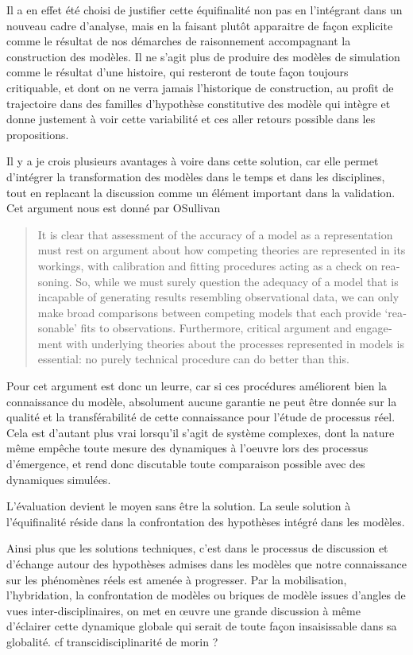 Il a en effet été choisi de justifier cette équifinalité non pas en l'intégrant dans un nouveau cadre d'analyse, mais en la faisant plutôt apparaitre de façon explicite comme le résultat de nos démarches de raisonnement accompagnant la construction des modèles. Il ne s'agit plus de produire des modèles de simulation comme le résultat d'une histoire, qui resteront de toute façon toujours critiquable, et dont on ne verra jamais l'historique de construction, au profit de trajectoire dans des familles d'hypothèse constitutive des modèle qui intègre et donne justement à voir cette variabilité et ces aller retours possible dans les propositions.

Il y a je crois plusieurs avantages à voire dans cette solution, car elle permet d'intégrer la transformation des modèles dans le temps et dans les disciplines, tout en replacant la discussion comme un élément important dans la validation. Cet argument nous est donné par OSullivan 

\foreignblockquote{english}[\cite{OSullivan2004}]{It is clear that assessment of the accuracy of a model as a representation must rest on argument about how competing theories are represented in its workings, with calibration and fitting procedures acting as a check on reasoning. So, while we must surely question the adequacy of a model that is incapable of generating results resembling observational data, we can only make broad comparisons between competing models that each provide ‘reasonable’ fits to observations. Furthermore, critical argument and engagement with underlying theories about the processes represented in models is essential: no purely technical procedure can do better than this.}

Pour \autocite{OSullivan2004} cet argument est donc un leurre, car si ces procédures améliorent bien la connaissance du modèle, absolument aucune garantie ne peut être donnée sur la qualité et la transférabilité de cette connaissance pour l'étude de processus réel. Cela est d'autant plus vrai lorsqu'il s'agit de système complexes, dont la nature même empêche toute  mesure des dynamiques à l'oeuvre lors des processus d'émergence, et rend donc discutable toute comparaison possible avec des dynamiques simulées.

L'évaluation devient le moyen sans être la solution. La seule solution à l'équifinalité réside dans la confrontation des hypothèses intégré dans les modèles. 


Ainsi plus que les solutions techniques, c'est dans le processus de discussion et d'échange autour des hypothèses admises dans les modèles que notre connaissance sur les phénomènes réels est amenée à progresser. Par la mobilisation, l'hybridation, la confrontation de modèles ou briques de modèle issues d'angles de vues inter-disciplinaires,  on met en œuvre une grande discussion à même d'éclairer cette dynamique globale qui serait de toute façon insaisissable dans sa globalité. {cf transcidisciplinarité de morin ?}

